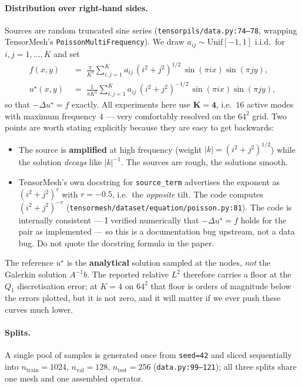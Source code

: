 \documentclass[11pt]{article}
\begin{document}
\paragraph{Distribution over right-hand sides.}
Sources are random truncated sine series (\texttt{tensorpils/data.py:74--78}, wrapping
TensorMesh's \texttt{PoissonMultiFrequency}). We draw $a_{ij} \sim \mathrm{Unif}[-1,1]$
i.i.d.\ for $i,j = 1,\dots,K$ and set
\begin{align*}
  f(x,y) &\;=\; \frac{\pi}{K^2}\sum_{i,j=1}^{K} a_{ij}\,(i^2+j^2)^{1/2}\,\sin(\pi i x)\sin(\pi j y), \\
  u^\star(x,y) &\;=\; \frac{1}{\pi K^2}\sum_{i,j=1}^{K} a_{ij}\,(i^2+j^2)^{-1/2}\,\sin(\pi i x)\sin(\pi j y),
\end{align*}
so that $-\Delta u^\star = f$ exactly. All experiments here use $\mathbf{K=4}$, i.e.\ $16$ active
modes with maximum frequency $4$ --- very comfortably resolved on the $64^2$ grid. Two points are
worth stating explicitly because they are easy to get backwards:
\begin{itemize}
  \item The source is \textbf{amplified} at high frequency (weight $|k| = (i^2+j^2)^{1/2}$) while
        the solution \emph{decays} like $|k|^{-1}$. The sources are rough, the solutions smooth.
  \item TensorMesh's own docstring for \texttt{source\_term} advertises the exponent as
        $(i^2+j^2)^{r}$ with $r=-0.5$, i.e.\ the \emph{opposite} tilt. The code computes
        $(i^2+j^2)^{-r}$ (\texttt{tensormesh/dataset/equation/poisson.py:81}). The code is
        internally consistent --- I verified numerically that $-\Delta u^\star = f$ holds for the
        pair as implemented --- so this is a documentation bug upstream, not a data bug. Do not
        quote the docstring formula in the paper.
\end{itemize}
The reference $u^\star$ is the \textbf{analytical} solution sampled at the nodes, \emph{not} the
Galerkin solution $A^{-1}b$. The reported relative $L^2$ therefore carries a floor at the $Q_1$
discretisation error; at $K=4$ on $64^2$ that floor is orders of magnitude below the errors
plotted, but it is not zero, and it will matter if we ever push these curves much lower.

\paragraph{Splits.} A single pool of samples is generated once from \texttt{seed=42} and sliced
sequentially into $n_{\text{train}} = 1024$, $n_{\text{val}} = 128$, $n_{\text{test}} = 256$
(\texttt{data.py:99--121}); all three splits share one mesh and one assembled operator.
\end{document}
